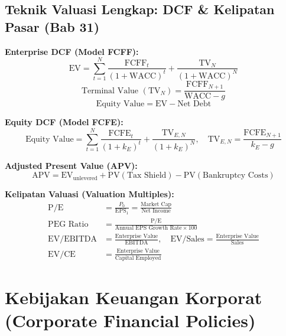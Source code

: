 \documentclass[10pt,a4paper]{article}
\begin{document}
\subsection{Teknik Valuasi Lengkap: DCF \& Kelipatan Pasar (Bab 31)}

\textbf{Enterprise DCF (Model FCFF):}
\begin{equation}
\text{EV} = \sum_{t=1}^N \frac{\text{FCFF}_t}{(1 + \text{WACC})^t} + \frac{\text{TV}_N}{(1 + \text{WACC})^N}
\end{equation}
\begin{equation}
\text{Terminal Value } (\text{TV}_N) = \frac{\text{FCFF}_{N+1}}{\text{WACC} - g}
\end{equation}
\begin{equation}
\text{Equity Value} = \text{EV} - \text{Net Debt}
\end{equation}

\textbf{Equity DCF (Model FCFE):}
\begin{equation}
\text{Equity Value} = \sum_{t=1}^N \frac{\text{FCFE}_t}{(1 + k_E)^t} + \frac{\text{TV}_{E,N}}{(1 + k_E)^N}, \quad \text{TV}_{E,N} = \frac{\text{FCFE}_{N+1}}{k_E - g}
\end{equation}

\textbf{Adjusted Present Value (APV):}
\begin{equation}
\text{APV} = \text{EV}_{\text{unlevered}} + \text{PV}(\text{Tax Shield}) - \text{PV}(\text{Bankruptcy Costs})
\end{equation}

\textbf{Kelipatan Valuasi (Valuation Multiples):}
\begin{align}
\text{P/E} &= \frac{P_0}{\text{EPS}_1} = \frac{\text{Market Cap}}{\text{Net Income}} \\
\text{PEG Ratio} &= \frac{\text{P/E}}{\text{Annual EPS Growth Rate} \times 100} \\
\text{EV/EBITDA} &= \frac{\text{Enterprise Value}}{\text{EBITDA}}, \quad \text{EV/Sales} = \frac{\text{Enterprise Value}}{\text{Sales}} \\
\text{EV/CE} &= \frac{\text{Enterprise Value}}{\text{Capital Employed}}
\end{align}

\section{Kebijakan Keuangan Korporat (Corporate Financial Policies)}
\end{document}
